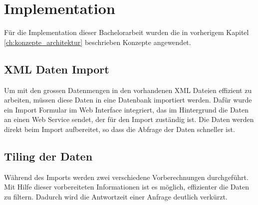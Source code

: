 \chapter{Implementation}
Für die Implementation dieser Bachelorarbeit wurden die in vorherigem Kapitel \ref{ch:konzepte_architektur}  beschrieben Konzepte angewendet.
\section{XML Daten Import}
Um mit den grossen Datenmengen in den vorhandenen XML Dateien effizient zu arbeiten, müssen diese Daten in eine Datenbank importiert werden. Dafür wurde ein Import Formular im Web Interface integriert, das im Hintergrund die Daten an einen Web Service sendet, der für den Import zuständig ist. Die Daten werden direkt beim Import aufbereitet, so dass die Abfrage der Daten schneller ist.
\section{Tiling der Daten}
\label{sec:tilingdataimplementation}
Während des Imports werden zwei verschiedene Vorberechnungen durchgeführt. Mit Hilfe dieser vorbereiteten Informationen ist es möglich, effizienter die Daten zu filtern. Dadurch wird die Antwortzeit einer Anfrage deutlich verkürzt.
